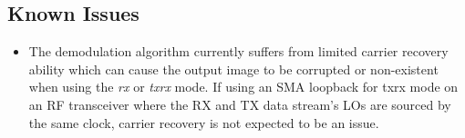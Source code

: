 \subsection{Known Issues}
\noindent
\begin{itemize}
  \item  %
    The demodulation algorithm currently suffers from limited carrier
    recovery ability which can cause the output image to be corrupted or
    non-existent
    when using the \textit{rx} or \textit{txrx} mode.
    If using an SMA loopback for txrx mode
    on an RF transceiver where the RX and TX data stream's LOs are sourced by
    the same clock, carrier recovery is not
    expected to be an issue.

\end{itemize}
\begin{appendices}

\end{appendices}

